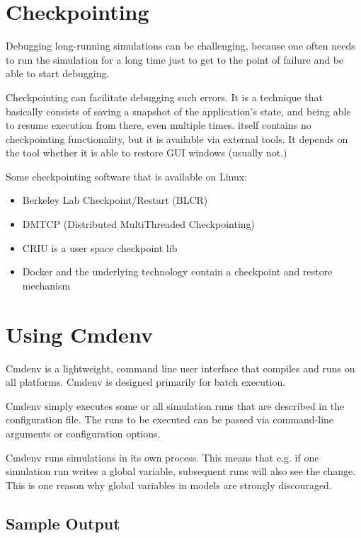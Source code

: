 \section{Checkpointing}
\label{sec:run-sim:checkpointing}

Debugging long-running simulations can be challenging, because one often needs
to run the simulation for a long time just to get to the point of failure and
be able to start debugging. 

Checkpointing can facilitate debugging such errors. It is a technique that
basically consists of saving a snapshot of the application's state, and being
able to resume execution from there, even multiple times. 
{\opp} itself contains no checkpointing functionality, but it is available via
external tools. It depends on the tool whether it is able to restore GUI windows
(usually not.) 

Some checkpointing software that is available on Linux:

\begin{itemize}
  \item Berkeley Lab Checkpoint/Restart (BLCR)
  \item DMTCP (Distributed MultiThreaded Checkpointing)
  \item CRIU is a user space checkpoint lib
  \item Docker and the underlying technology contain a checkpoint and restore mechanism
\end{itemize}


\section{Using Cmdenv}
\label{sec:run-sim:cmdenv}

Cmdenv is a lightweight, command line user interface that
compiles and runs on all platforms. Cmdenv is designed primarily for batch
execution.

Cmdenv simply executes some or all simulation runs that are described
in the configuration file. The runs to be executed can be
passed via command-line arguments or configuration options. 

Cmdenv runs simulations in its own process. This means that e.g. if one
simulation run writes a global variable, subsequent runs will also
see the change. This is one reason why global variables in models are
strongly discouraged.

\subsection{Sample Output}
\label{sec:run-sim:cmdenv:sample-output}

